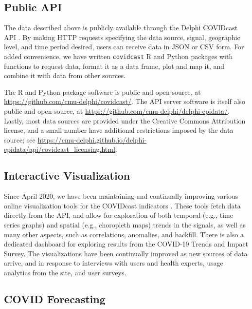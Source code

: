 \documentclass[11pt]{article}
\begin{document}
\subsection{Public API}

The data described above is publicly available through the Delphi COVIDcast API
\cite{CovidcastAPI}.  By making HTTP requests specifying the data source,
signal, geographic level, and time period desired, users can receive data in
JSON or CSV form. For added convenience, we have written \texttt{covidcast} R
\cite{CovidcastR} and Python \cite{CovidcastPy} packages with functions to
request data, format it as a data frame, plot and map it, and combine it with
data from other sources.

The R and Python package software is public and open-source, at
\url{https://github.com/cmu-delphi/covidcast/}.  The API server software is
itself also public and open-source, at
\url{https://github.com/cmu-delphi/delphi-epidata/}.  Lastly, most data sources
are provided under the Creative Commons Attribution license, and a small number
have additional restrictions imposed by the data source; see
\url{https://cmu-delphi.github.io/delphi-epidata/api/covidcast_licensing.html}.

\subsection{Interactive Visualization}

Since April 2020, we have been maintaining and continually improving various
online visualization tools for the COVIDcast indicators \cite{CovidcastViz}.
These tools fetch data directly from the API, and allow for exploration of both
temporal (e.g., time series graphs) and spatial (e.g., choropleth maps) trends
in the signals, as well as many other aspects, such as correlations, anomalies,
and backfill. There is also a dedicated dashboard for exploring results from the
COVID-19 Trends and Impact Survey. The visualizations have been continually
improved as new sources of data arrive, and in response to interviews with users
and health experts, usage analytics from the site, and user surveys.%

\subsection{COVID Forecasting}
\end{document}
